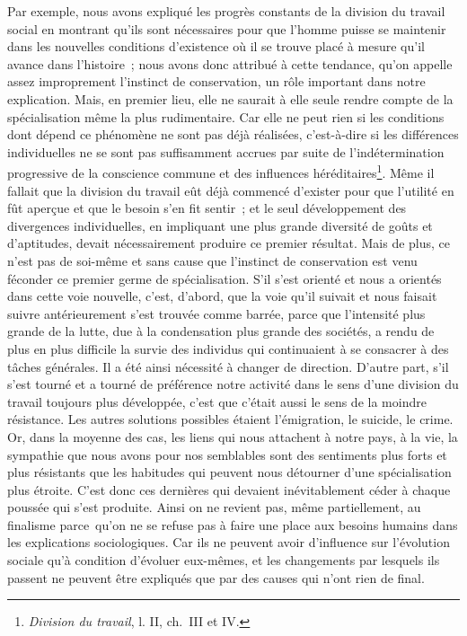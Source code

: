 \documentclass[french,twoside]{book} %
\begin{document}
Par exemple, nous avons expliqué les progrès constants de la division du travail social en montrant qu’ils sont nécessaires pour que l’homme puisse se maintenir dans les nouvelles conditions d’existence où il se trouve placé à mesure qu’il avance dans l’histoire ; nous avons donc attribué à cette tendance, qu’on appelle assez improprement l’instinct de conservation, un rôle important dans notre explication. Mais, en premier lieu, elle ne saurait à elle seule rendre compte de la spécialisation même la plus rudimentaire. Car elle ne peut rien si les conditions dont dépend ce phénomène ne sont pas déjà réalisées, c’est-à-dire si les différences individuelles ne se sont pas suffisamment accrues par suite de l’indétermination progressive de la conscience commune et des influences héréditaires\footnote{\emph{Division du travail}, l. II, ch. III et IV.}. Même il fallait que la division du travail eût déjà commencé d’exister pour que l’utilité en fût aperçue et que le besoin s’en fit sentir ; et le seul développement des divergences individuelles, en impliquant une plus grande diversité de goûts et d’aptitudes, devait nécessairement produire ce premier résultat. Mais de plus, ce n’est pas de soi-même et sans cause que l’instinct de conservation est venu féconder ce premier germe de spécialisation. S’il s’est orienté et nous a orientés dans cette voie nouvelle, c’est, d’abord, que la voie qu’il suivait et nous faisait suivre antérieurement s’est trouvée comme barrée, parce que l’intensité plus grande de la lutte, due à la condensation plus grande des sociétés, a rendu de plus en plus difficile la survie des individus qui continuaient à se consacrer à des tâches générales. Il a été ainsi nécessité à changer de direction. D’autre part, s’il s’est tourné et a tourné de préférence notre activité dans le sens d’une division du travail toujours plus développée, c’est que c’était aussi le sens de la moindre résistance. Les autres solutions possibles étaient l’émigration, le suicide, le crime. Or, dans la moyenne des cas, les liens qui nous attachent à notre pays, à la vie, la sympathie que nous avons pour nos semblables sont des sentiments plus forts et plus résistants que les habitudes qui peuvent nous détourner d’une spécialisation plus étroite. C’est donc ces dernières qui devaient inévitablement céder à chaque poussée qui s’est produite. Ainsi on ne revient pas, même partiellement, au finalisme parce qu’on ne se refuse pas à faire une place aux besoins humains dans les explications sociologiques. Car ils ne peuvent avoir d’influence sur l’évolution sociale qu’à condition d’évoluer eux-mêmes, et les changements par lesquels ils passent ne peuvent être expliqués que par des causes qui n’ont rien de final.\par
\end{document}
